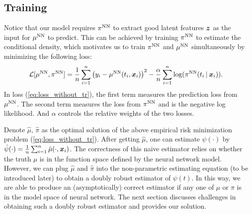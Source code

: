 
\subsection{Training}
Notice that our model requires $\pi^{\text{NN}}$ to extract good latent features $\boldsymbol{z}$ as the input for $\mu^{\text{NN}}$ to predict. This can be achieved by training $\pi^{\text{NN}}$ to estimate the conditional density, which motivates us to train $\pi^{\text{NN}}$ and ${\mu}^{\text{NN}}$ simultaneously by minimizing the following loss:
\begin{equation}\label{eq:loss_without_tr}
    \mathcal{L}[\mu^{\text{NN}}, \pi^{\text{NN}}] = \frac{1}{n}\sum_{i=1}^n
    \left(y_i-\mu^{\text{NN}}(t_i,\boldsymbol{x}_i)\right)^2 -\frac{\alpha}{n}\sum_{i=1}^n{\log(\pi^{\text{NN}}(t_i\,|\: \boldsymbol{x}_i))}.
\end{equation}
In loss (\ref{eq:loss_without_tr}), the first term measures the prediction loss from $\mu^{\text{NN}}$. The second term measures the loss from $\pi^{\text{NN}}$ and is the negative log likelihood. And $\alpha$ controls the relative weights of the two losses. 

Denote $\hat \mu$, $\hat\pi$ as the optimal solution of the above empirical risk minimization problem (\ref{eq:loss_without_tr}). After getting $\hat\mu$, one can estimate $\psi(\cdot)$ by $\hat\psi(\cdot)=\frac{1}{n}\sum_{i=1}^n\hat \mu(\cdot,\boldsymbol{x}_i)$. The correctness of this naive estimator relies on whether the truth $\mu$ is in the function space defined by the neural network model. However, we can plug $\hat \mu$ and $\hat\pi$ into the non-parametric estimating equation (to be introduced later) to obtain a doubly robust estimator of $\psi(t)$. In this way, we are able to produce an (asymptotically) correct estimator if any one of $\mu$ or $\pi$ is in the model space of neural network. The next section discusses challenges in obtaining such a doubly robust estimator and provides our solution.




